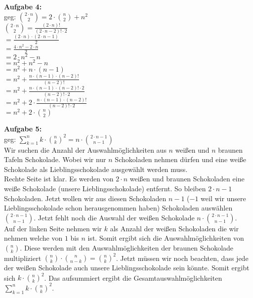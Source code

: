 \documentclass[a4paper]{scrartcl}
\begin{document}
	\begin{flushleft}
		\textbf{Aufgabe 4:}\\
		geg: $\binom{2\cdot n}{2}=2\cdot\binom{n}{2}+n^2$\\[1em]
		$\binom{2\cdot n}{2}=\frac{(2\cdot n)!}{(2\cdot n-2)!\cdot 2}$\\
		$=\frac{(2\cdot n)\cdot (2\cdot n-1)}{2}$\\
		$=\frac{4\cdot n^2 - 2\cdot n}{2}$\\
		$=2\cdot n^2 - n$\\
		$=n^2 + n^2 - n$\\
		$=n^2 + n\cdot(n-1)$\\
		$=n^2+\frac{n\cdot(n-1)\cdot (n-2)!}{(n-2)!}$\\
		$=n^2+\frac{n\cdot(n-1)\cdot (n-2)!\cdot 2}{(n-2)!\cdot 2}$\\
		$=n^2+2\cdot\frac{n\cdot(n-1)\cdot (n-2)!}{(n-2)!\cdot 2}$\\
		$=n^2+2\cdot\binom{n}{2}$\\[1em]
	\end{flushleft}
	\begin{flushleft}
		\textbf{Aufgabe 5:}\\	
		geg: $\sum\limits_{k=1}^{n}k\cdot \binom{n}{k}^2 = n\cdot \binom{2\cdot n -1}{n-1}$\\
		Wir suchen die Anzahl der Auswahlmöglichkeiten aus $n$ weißen und $n$ braunen Tafeln Schokolade. Wobei wir nur $n$ Schokoladen nehmen dürfen und eine weiße Schokolade als Lieblingsschokolade ausgewählt werden muss.\\[1em]
		Rechte Seite ist klar. Es werden von $2\cdot n$ weißen und braunen Schokoladen eine weiße Schokolade (unsere Lieblingsschokolade) entfernt. So bleiben $2\cdot n - 1$ Schokoladen. Jetzt wollen wir aus diesen Schokoladen $n-1$ ($-1$ weil wir unsere Lieblingsschokolade schon herausgenommen haben) Schokoladen auswählen $\binom{2\cdot n -1}{n-1}$. Jetzt  fehlt noch die Auswahl der weißen Schokolade $n\cdot\binom{2\cdot n -1}{n-1}$.\\[1em]
		Auf der linken Seite nehmen wir $k$ als Anzahl der weißen Schokoladen die wir nehmen welche von $1$ bis $n$ ist. Somit ergibt sich die Auswahlmöglichkeiten von $\binom{n}{k}$. Diese werden mit den Auswahlmöglichkeiten der braunen Schokolade multipliziert $\binom{n}{k}\cdot\binom{n}{n-k}=\binom{n}{k}^2$. Jetzt müssen wir noch beachten, dass jede der weißen Schokolade auch unsere Lieblingsschokolade sein könnte. Somit ergibt sich $k\cdot\binom{n}{k}^2$. Das aufsummiert ergibt die Gesamtauswahlmöglichkeiten $\sum\limits_{k=1}^{n}k\cdot \binom{n}{k}^2$.
	\end{flushleft}
\end{document}
